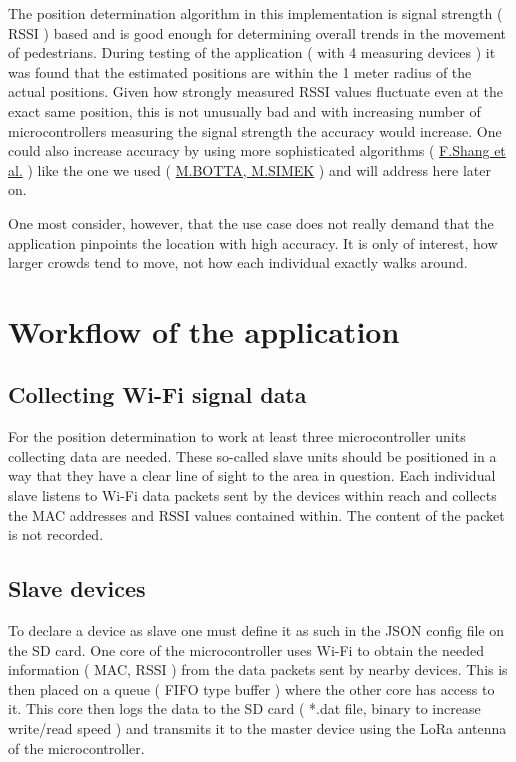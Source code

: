 \documentclass[11pt,a4paper]{article}
\numberwithin{equation}{section}   %
\numberwithin{figure}{section}     %
\numberwithin{table}{section}      %
\begin{document}
The position determination algorithm in this implementation is signal strength ( RSSI ) based \cite{BottaSimek} and is good enough for determining overall trends in the movement of pedestrians. During testing of the application ( with 4 measuring devices ) it was found that the estimated positions are within the 1 meter radius of the actual positions. Given how strongly measured RSSI values fluctuate even at the exact same position, this is not unusually bad and with increasing number of microcontrollers measuring the signal strength the accuracy would increase. One could also increase accuracy by using more sophisticated algorithms ( \href{https://journals.sagepub.com/doi/full/10.1155/2014/371350}{F.Shang et al.} \cite{Shang} ) like the one we used ( \href{https://core.ac.uk/download/pdf/30312076.pdf}{M.BOTTA, M.SIMEK} \cite{BottaSimek} ) and will address here later on.

One most consider, however, that the use case does not really demand that the application pinpoints the location with high accuracy. It is only of interest, how larger crowds tend to move, not how each individual exactly walks around.





\newpage

\twocolumn
\section{Workflow of the application}

\subsection{Collecting Wi-Fi signal data}
For the position determination to work at least three microcontroller units collecting data are needed. These so-called slave units should be positioned in a way that they have a clear line of sight to the area in question. Each individual slave listens to Wi-Fi data packets sent by the devices within reach and collects the MAC addresses and RSSI values contained within. The content of the packet is not recorded.

\subsection{Slave devices}
To declare a device as slave one must define it as such in the JSON config file on the SD card. One core of the microcontroller uses Wi-Fi to obtain the needed information ( MAC, RSSI ) from the data packets sent by nearby devices. This is then placed on a queue ( FIFO type buffer ) where the other core has access to it. This core then logs the data to the SD card ( *.dat file, binary to increase write/read speed ) and transmits it to the master device using the LoRa antenna of the microcontroller.
\end{document}
